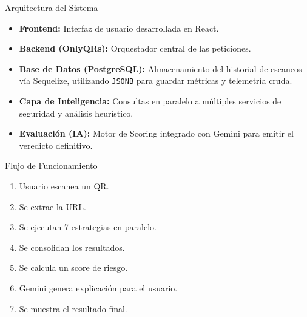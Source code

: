 \documentclass{beamer}
\begin{document}
\begin{frame}{Arquitectura del Sistema}

\centering


\vspace{0.6cm}

\begin{itemize}
    \item \textbf{Frontend:} Interfaz de usuario desarrollada en React.
    \item \textbf{Backend (OnlyQRs):} Orquestador central de las peticiones.
    \item \textbf{Base de Datos (PostgreSQL):} Almacenamiento del historial de escaneos vía Sequelize, utilizando \texttt{JSONB} para guardar métricas y telemetría cruda.
    \item \textbf{Capa de Inteligencia:} Consultas en paralelo a múltiples servicios de seguridad y análisis heurístico.
    \item \textbf{Evaluación (IA):} Motor de Scoring integrado con Gemini para emitir el veredicto definitivo.
\end{itemize}

\end{frame}


\begin{frame}{Flujo de Funcionamiento}

\begin{enumerate}
\item Usuario escanea un QR.
\item Se extrae la URL.
\item Se ejecutan 7 estrategias en paralelo.
\item Se consolidan los resultados.
\item Se calcula un score de riesgo.
\item Gemini genera explicación para el usuario.
\item Se muestra el resultado final.
\end{enumerate}


\end{frame}
\end{document}
